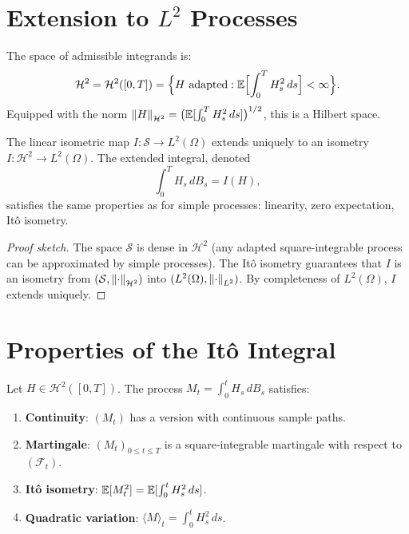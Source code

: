 \section{Extension to $L^2$ Processes}

\begin{definition}
The space of admissible integrands is:
\[
  \mathcal{H}^2 = \mathcal{H}^2([0, T]) = \Bigl\{H \text{ adapted}
  : \mathbb{E}\Bigl[\int_0^T H_s^2 \, ds\Bigr] < \infty \Bigr\}.
\]
Equipped with the norm
$\left\| H \right\|_{\mathcal{H}^2} = \bigl(\mathbb{E}[\int_0^T H_s^2 \, ds]\bigr)^{1/2}$,
this is a Hilbert space.
\end{definition}

\begin{theorem}
\label{thm:ito_extension}
The linear isometric map $I : \mathcal{S} \to L^2(\Omega)$ extends uniquely to
an isometry $I : \mathcal{H}^2 \to L^2(\Omega)$. The extended integral, denoted
\[
  \int_0^T H_s \, dB_s = I(H),
\]
satisfies the same properties as for simple processes: linearity, zero
expectation, It\^o isometry.
\end{theorem}

\begin{proof}[Proof sketch]
The space $\mathcal{S}$ is dense in $\mathcal{H}^2$ (any adapted
square-integrable process can be approximated by simple processes). The It\^o
isometry guarantees that $I$ is an isometry from
$(\mathcal{S}, \left\| \cdot \right\|_{\mathcal{H}^2})$ into
$(L^2(\Omega), \left\| \cdot \right\|_{L^2})$. By completeness of $L^2(\Omega)$, $I$
extends uniquely.
\end{proof}

\section{Properties of the It\^o Integral}

\begin{theorem}
\label{thm:ito_props}
Let $H \in \mathcal{H}^2([0,T])$. The process $M_t = \int_0^t H_s \, dB_s$
satisfies:
\begin{enumerate}
  \item \textbf{Continuity}: $(M_t)$ has a version with continuous sample paths.
  \item \textbf{Martingale}: $(M_t)_{0 \leq t \leq T}$ is a square-integrable
    martingale with respect to $(\mathcal{F}_t)$.
  \item \textbf{It\^o isometry}: $\mathbb{E}[M_t^2] = \mathbb{E}[\int_0^t H_s^2 \, ds]$.
  \item \textbf{Quadratic variation}: $\langle M \rangle_t = \int_0^t H_s^2 \, ds$.
\end{enumerate}
\end{theorem}


